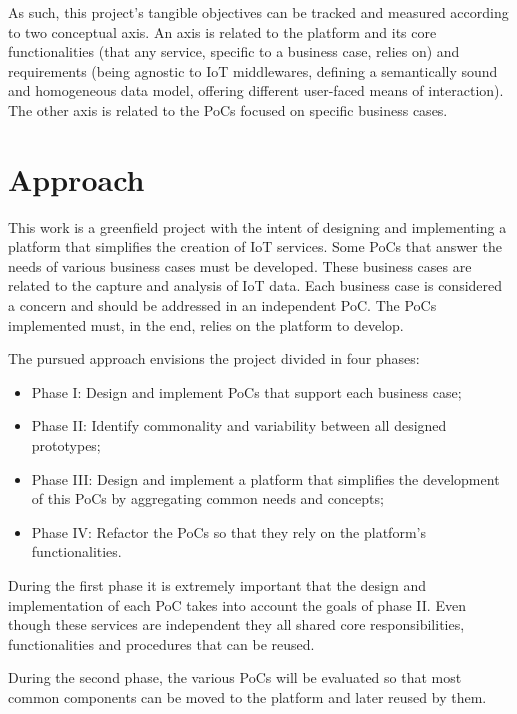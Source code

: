 As such, this project's tangible objectives can be tracked and measured according to two conceptual axis.
An axis is related to the platform and its core functionalities (that any service, specific to a business case, relies on) and requirements (being agnostic to \gls{IoT} middlewares, defining a semantically sound and homogeneous data model, offering different user-faced means of interaction). The other axis is related to the \gls{PoC}s focused on specific business cases.

\section{Approach}
\label{sec:introduction:approach}

This work is a greenfield project with the intent of designing and implementing a platform that simplifies the creation of \gls{IoT} services. Some \gls{PoC}s that answer the needs of various business cases must be developed. These business cases are related to the capture and analysis of \gls{IoT} data.
Each business case is considered a concern and should be addressed in an independent \gls{PoC}.
The \gls{PoC}s implemented must, in the end, relies on the platform to develop.

The pursued approach envisions the project divided in four phases:

\begin{itemize}
    \item Phase I: Design and implement \gls{PoC}s that support each business case;
    \item Phase II: Identify commonality and variability between all designed prototypes;
    \item Phase III: Design and implement a platform that simplifies the development of this \gls{PoC}s by aggregating common needs and concepts;
    \item Phase IV: Refactor the \gls{PoC}s so that they rely on the platform's functionalities.
\end{itemize}

During the first phase it is extremely important that the design and implementation of each \gls{PoC} takes into account the goals of phase II. Even though these services are independent they all shared core responsibilities, functionalities and procedures that can be reused.

During the second phase, the various \gls{PoC}s will be evaluated so that most common components can be moved to the platform and later reused by them.

